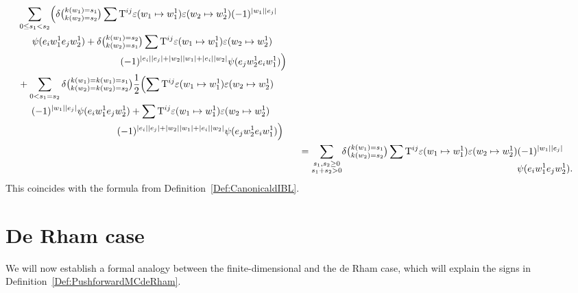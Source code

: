 \documentclass[\MainFolder/Text.tex]{subfiles}
\begin{document}
\begin{Example}
\[\begin{aligned}
\begin{aligned}[t]
& \begin{multlined}[t]\sum_{0\le s_1 < s_2} \Bigl(\delta\bigl(\substack{k(w_1) = s_1 \\ k(w_2) = s_2}\bigr)\sum \TKer^{ij} \varepsilon(w_1\mapsto w_1^1) \varepsilon(w_2\mapsto w_2^1)(-1)^{\Abs{w_1} \Abs{e_j}} \\
\psi(e_i w_1^1 e_j w_2^1) +\delta\bigl(\substack{k(w_1) = s_2 \\ k(w_2) = s_1}\bigr) \sum \TKer^{ij} \varepsilon(w_1\mapsto w_1^1)\varepsilon(w_2\mapsto w_2^1)\\ (-1)^{\Abs{e_i} \Abs{e_j} + \Abs{w_2} \Abs{w_1} + \Abs{e_i}\Abs{w_2}} \psi(e_j w_2^1 e_i w_1^1) \Bigr)
\end{multlined}\\
&\begin{multlined}{}+\sum_{0< s_1 = s_2} \delta\bigl(\substack{k(w_1) = k(w_1) = s_1 \\ k(w_2) = k(w_2) = s_2}\bigr) 
\frac{1}{2} \Bigl(\sum \TKer^{ij} \varepsilon(w_1\mapsto w_1^1) \varepsilon(w_2\mapsto w_2^1)\\ (-1)^{\Abs{w_1} \Abs{e_j}} \psi(e_i w_1^1 e_j w_2^1) + \sum \TKer^{ij} \varepsilon(w_1\mapsto w_1^1)\varepsilon(w_2\mapsto w_2^1) \\ (-1)^{\Abs{e_i} \Abs{e_j} + \Abs{w_2} \Abs{w_1} + \Abs{e_i}\Abs{w_2}} \psi(e_j w_2^1 e_i w_1^1) \Bigr) \end{multlined}
\end{aligned} \\
&\; = \begin{multlined}[t] \smash{\sum_{\substack{s_1, s_2 \ge 0 \\ s_1 + s_2 > 0}}} \delta\bigl(\substack{k(w_1) = s_1 \\ k(w_2) = s_2}\bigr) \sum \TKer^{ij} \varepsilon(w_1 \mapsto w_1^1)\varepsilon(w_2 \mapsto w_2^1)(-1)^{\Abs{w_1}\Abs{e_j}} \\ \psi(e_i w_1^1 e_j w_2^1).\end{multlined}
\end{aligned}\]
This coincides with the formula from Definition~\ref{Def:CanonicaldIBL}.
\end{Example}

\section{De Rham case}

We will now establish a formal analogy between the finite-dimensional and the de Rham case, which will explain the signs in Definition~\ref{Def:PushforwardMCdeRham}.
\end{document}
